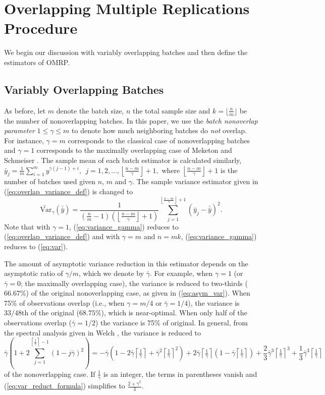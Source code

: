 \documentclass[12pt]{article}
\newcommand{\vartg}[1]{\widetilde{\mathrm{Var}}_\gamma \left( #1 \right)}
\newcommand{\nb}{\left\lfloor\tfrac{n-m}{\gamma}\right\rfloor+1}
\newcommand{\gammab}{\bar{\gamma}}
\newcommand{\ogb}{\tfrac{1}{\gammab}}
\newcommand{\cogb}{\left\lceil\ogb\right\rceil}
\newcommand{\yb}{\bar{y}}
\newcommand{\ybb}{\bar{\yb}}
\begin{document}
\section{Overlapping Multiple Replications Procedure} 
\label{sec:omrp}

We begin our discussion with variably overlapping batches and then define the estimators of OMRP.

\subsection{Variably Overlapping Batches} 
\label{ssec:overlap}

As before, let $m$ denote the batch size, $n$ the total sample size and $k = \lfloor \tfrac{n}{m} \rfloor$ be the number of nonoverlapping batches.  
In this paper, we use the {\it batch nonoverlap parameter} $1 \leq \gamma \leq m$ to denote how much neighboring batches do {\it not} overlap.  
For instance, $\gamma = m$ corresponds to the classical case of nonoverlapping batches and $\gamma = 1$ corresponds to the maximally overlapping case of Meketon and Schmeiser \citep{Meketon1984}.  
The sample mean of each batch estimator is calculated similarly, 
$
\yb_j = \frac{1}{m} \sum_{i=1}^m y^{\gamma(j-1) + i},\ \  j = 1, 2, \dots, \nb, 
$
where $\nb$ is the number of batches used given $n$, $m$ and $\gamma$.  
The sample variance estimator given in (\ref{eq:overlap_variance_def}) is changed to
\begin{equation} \label{eq:variance_gamma}
	\vartg{\ybb} = \frac{1}{\left( \tfrac{n}{m} - 1 \right) \left( \nb \right)}  \sum_{j=1}^{\nb} (\yb_j - \ybb)^2.
\end{equation}
Note that with $\gamma=1$, (\ref{eq:variance_gamma}) reduces to (\ref{eq:overlap_variance_def}) and with $\gamma=m$ and $n=mk$, (\ref{eq:variance_gamma}) reduces to (\ref{eq:var}).

The amount of asymptotic variance reduction in this estimator depends on the asymptotic ratio of $\gamma/m$, which we denote by $\gammab$.  
For example, when $\gamma = 1$ (or $\gammab=0$; the maximally overlapping case), the variance is reduced to two-thirds ($66.67\%$) of the original nonoverlapping case, as given in (\ref{eq:asym_var}).  
When 75\% of observations overlap (i.e., when $\gamma = m/4$ or $\gammab = 1/4$), the variance is $33/48$th of the original ($68.75\%$), which is near-optimal.   
When only half of the observations overlap ($\gammab = 1/2$) the variance is 75\% of original.  
In general, from the spectral analysis given in Welch \citep{Welch1987}, the variance is reduced to
\begin{equation} \label{eq:var_reduct_formula}
	\gammab \left( 1 + 2 \sum_{j=1}^{\cogb-1} (1-j\gammab)^2 \right) = -\gammab\left( 1 - 2\gammab\cogb + \gammab^2\cogb^2 \right) + 2\gammab\cogb\left(1-\gammab\cogb\right) + \frac{2}{3}\gammab^3\cogb^3 + \frac{1}{3}\gammab^3\cogb
\end{equation}
of the nonoverlapping case.  
If $\ogb$ is an integer, the terms in parentheses vanish and (\ref{eq:var_reduct_formula}) simplifies to $\frac{2+\gammab^2}{3}$.
\end{document}

